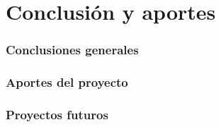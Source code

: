 
\chapter{Conclusión y aportes} \label{capitulo8} 

\subsection{Conclusiones generales}

\subsection{Aportes del proyecto}

\subsection{Proyectos futuros}